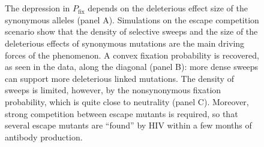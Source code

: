 \documentclass[rmp, twocolumn]{revtex4}
\begin{document}
\begin{figure}
\begin{center}
\\
\\
\caption{The depression in $P_\text{fix}$ depends on the deleterious effect size
 of the synonymous alleles (panel A). Simulations on the escape competition
 scenario show that the density of selective sweeps and the size of the
 deleterious effects of synonymous mutations are the main driving forces of the
 phenomenon. A convex fixation probability is recovered, as seen in the data,
 along the diagonal (panel B): more dense sweeps can support more deleterious
 linked mutations. The density of sweeps is limited, however, by the
 nonsynonymous fixation probability, which is quite close to neutrality (panel
 C). Moreover, strong competition between escape mutants is required, so that
 several escape mutants are ``found'' by HIV within a few months of antibody
production.}
\label{fig:simheat}
\end{center}
\end{figure}
\end{document}
